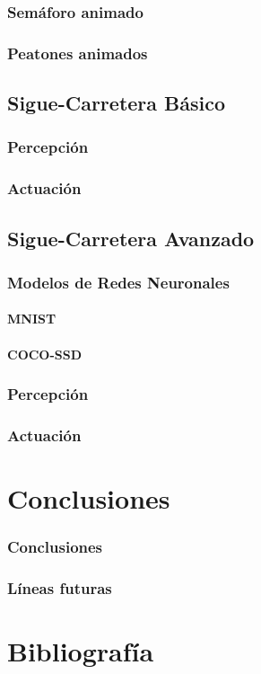 \documentclass{report}
\begin{document}
\subsection{Semáforo animado}
\subsection{Peatones animados}
\section{Sigue-Carretera Básico}
\subsection{Percepción}
\subsection{Actuación}
\section{Sigue-Carretera Avanzado}
\subsection{Modelos de Redes Neuronales}
\subsubsection{MNIST}
\subsubsection{COCO-SSD}
\subsection{Percepción}
\subsection{Actuación}

\chapter{Conclusiones}
\subsection{Conclusiones}
\subsection{Líneas futuras}

\chapter{Bibliografía}
\end{document}
